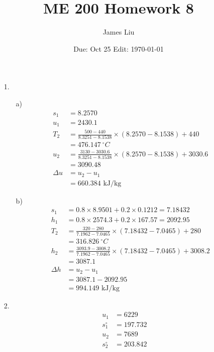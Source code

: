 \documentclass{article}
\date{Due: Oct 25 Edit: \today}
\title{ME 200 Homework 8}
\author{James Liu}
\begin{document}
\maketitle
\begin{itemize}
    \item [1.] 
    \begin{itemize}
        \item [a)]
        \begin{align*}
            s_1 &= 8.2570\\
            u_1 &= 2430.1\\
            T_2 &=\frac{500-440}{8.3251-8.1538}\times (8.2570-8.1538) +440\\
            &=476.147 \ {}^\circ C\\
            u_2 &=\frac{3130-3030.6}{8.3251-8.1538}\times (8.2570-8.1538)+3030.6\\
            &=3090.48\\
            \Delta u &= u_2-u_1\\
            &=660.384 \text{ kJ/kg}
        \end{align*}
        \item [b)]
        \begin{align*}
            s_1 &= 0.8\times 8.9501 + 0.2\times 0.1212 = 7.18432\\
            h_1 &= 0.8\times 2574.3 + 0.2 \times 167.57 = 2092.95\\
            T_2 &= \frac{320-280}{7.1962-7.0465}\times (7.18432-7.0465)+280\\
            &=316.826\ {}^\circ C\\
            h_2 &= \frac{3093.9-3008.2}{7.1962-7.0465}\times (7.18432-7.0465)+3008.2\\
            &=3087.1\\
            \Delta h &= u_2-u_1\\
            &=3087.1-2092.95\\
            &=994.149 \text{ kJ/kg}
        \end{align*}
    \end{itemize}
    \newpage
    \item[2.]
    \begin{align*}
        u_1 &= 6229\\
        s^\circ_1 &= 197.732\\
        u_2 &= 7689\\
        s^\circ_2 &=203.842\\
    \end{align*}

\end{itemize}
\end{document}
